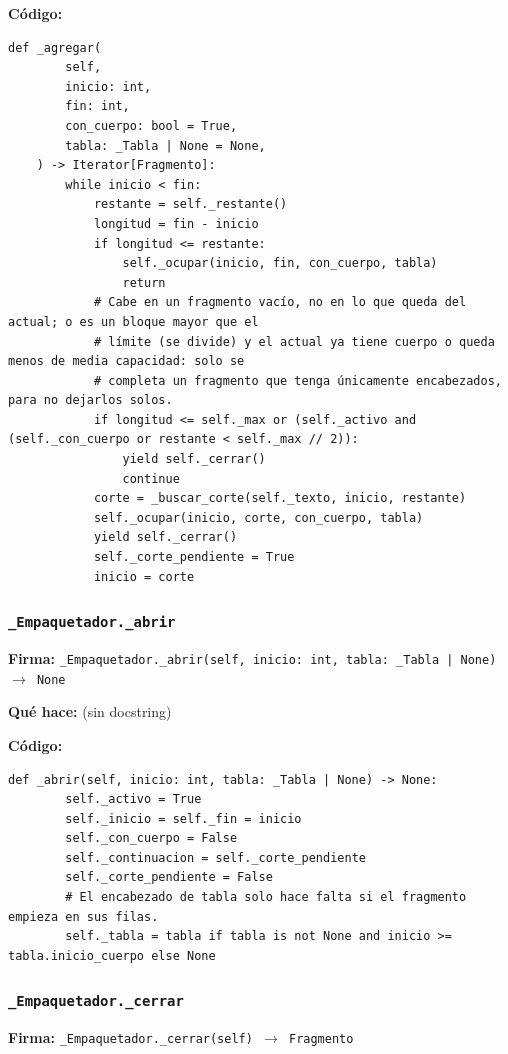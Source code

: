 \documentclass[11pt,a4paper]{article}
\begin{document}
\textbf{Código:}
\begin{lstlisting}
def _agregar(
        self,
        inicio: int,
        fin: int,
        con_cuerpo: bool = True,
        tabla: _Tabla | None = None,
    ) -> Iterator[Fragmento]:
        while inicio < fin:
            restante = self._restante()
            longitud = fin - inicio
            if longitud <= restante:
                self._ocupar(inicio, fin, con_cuerpo, tabla)
                return
            # Cabe en un fragmento vacío, no en lo que queda del actual; o es un bloque mayor que el
            # límite (se divide) y el actual ya tiene cuerpo o queda menos de media capacidad: solo se
            # completa un fragmento que tenga únicamente encabezados, para no dejarlos solos.
            if longitud <= self._max or (self._activo and (self._con_cuerpo or restante < self._max // 2)):
                yield self._cerrar()
                continue
            corte = _buscar_corte(self._texto, inicio, restante)
            self._ocupar(inicio, corte, con_cuerpo, tabla)
            yield self._cerrar()
            self._corte_pendiente = True
            inicio = corte
\end{lstlisting}

\subsubsection*{\texttt{\_Empaquetador.\_abrir}}
\textbf{Firma:} \texttt{\_Empaquetador.\_abrir(self, inicio: int, tabla: \_Tabla | None) $\rightarrow$ None}

\textbf{Qué hace:} (sin docstring)

\textbf{Código:}
\begin{lstlisting}
def _abrir(self, inicio: int, tabla: _Tabla | None) -> None:
        self._activo = True
        self._inicio = self._fin = inicio
        self._con_cuerpo = False
        self._continuacion = self._corte_pendiente
        self._corte_pendiente = False
        # El encabezado de tabla solo hace falta si el fragmento empieza en sus filas.
        self._tabla = tabla if tabla is not None and inicio >= tabla.inicio_cuerpo else None
\end{lstlisting}

\subsubsection*{\texttt{\_Empaquetador.\_cerrar}}
\textbf{Firma:} \texttt{\_Empaquetador.\_cerrar(self) $\rightarrow$ Fragmento}
\end{document}
